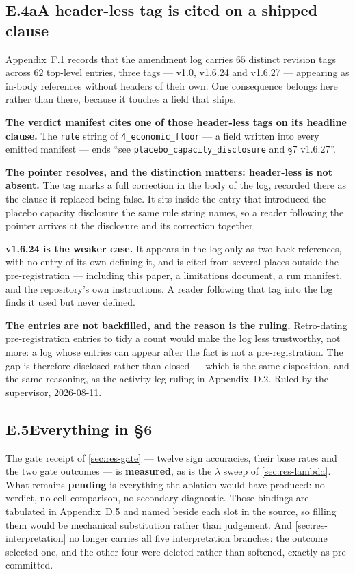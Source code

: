 \subsection*{E.4a\quad A header-less tag is cited on a shipped clause}

Appendix~F.1 records that the amendment log carries $65$ distinct revision tags across
$62$ top-level entries, three tags --- v1.0, v1.6.24 and v1.6.27 --- appearing as in-body
references without headers of their own. One consequence belongs here rather than there, because
it touches a field that ships.

\textbf{The verdict manifest cites one of those header-less tags on its headline clause.} The
\texttt{rule} string of \texttt{4\_economic\_floor} --- a field written into every emitted
manifest --- ends ``see \texttt{placebo\_\allowbreak capacity\_\allowbreak disclosure} and \S7 v1.6.27''.

\textbf{The pointer resolves, and the distinction matters: header-less is not absent.} The tag
marks a full correction in the body of the log, recorded there as the clause it replaced being
false. It sits inside the entry that introduced the placebo capacity disclosure the same rule
string names, so a reader following the pointer arrives at the disclosure and its correction
together.

\textbf{v1.6.24 is the weaker case.} It appears in the log only as two back-references, with no
entry of its own defining it, and is cited from several places outside the pre-registration ---
including this paper, a limitations document, a run manifest, and the repository's own
instructions. A reader following that tag into the log finds it used but never defined.

\textbf{The entries are not backfilled, and the reason is the ruling.} Retro-dating
pre-registration entries to tidy a count would make the log less trustworthy, not more: a log
whose entries can appear after the fact is not a pre-registration. The gap is therefore disclosed
rather than closed --- which is the same disposition, and the same reasoning, as the activity-leg
ruling in Appendix~D.2. Ruled by the supervisor, 2026-08-11.

\subsection*{E.5\quad Everything in \S6}

The gate receipt of \cref{sec:res-gate} --- twelve sign accuracies, their base rates and the two
gate outcomes --- is \textbf{measured}, as is the $\lambda$ sweep of \cref{sec:res-lambda}. What
remains \textbf{pending} is everything the ablation would have produced: no verdict, no cell
comparison, no secondary diagnostic. Those bindings are tabulated in Appendix~D.5 and named beside
each slot in the source, so filling them would be mechanical substitution rather than
judgement. And \cref{sec:res-interpretation} no longer carries all five
interpretation branches: the outcome selected one, and the other four were deleted rather than
softened, exactly as pre-committed.
